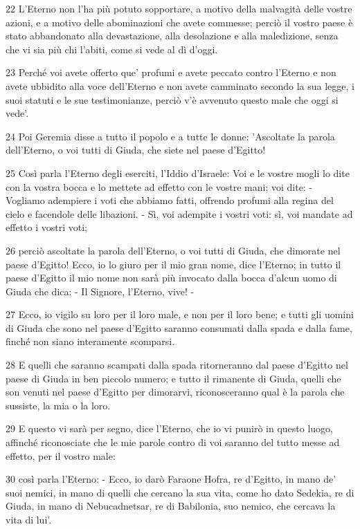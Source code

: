 \par 22 L'Eterno non l'ha più potuto sopportare, a motivo della malvagità delle vostre azioni, e a motivo delle abominazioni che avete commesse; perciò il vostro paese è stato abbandonato alla devastazione, alla desolazione e alla maledizione, senza che vi sia più chi l'abiti, come si vede al dì d'oggi.
\par 23 Perché voi avete offerto que' profumi e avete peccato contro l'Eterno e non avete ubbidito alla voce dell'Eterno e non avete camminato secondo la sua legge, i suoi statuti e le sue testimonianze, perciò v'è avvenuto questo male che oggi si vede'.
\par 24 Poi Geremia disse a tutto il popolo e a tutte le donne: 'Ascoltate la parola dell'Eterno, o voi tutti di Giuda, che siete nel paese d'Egitto!
\par 25 Così parla l'Eterno degli eserciti, l'Iddio d'Israele: Voi e le vostre mogli lo dite con la vostra bocca e lo mettete ad effetto con le vostre mani; voi dite: - Vogliamo adempiere i voti che abbiamo fatti, offrendo profumi alla regina del cielo e facendole delle libazioni. - Sì, voi adempite i vostri voti: sì, voi mandate ad effetto i vostri voti;
\par 26 perciò ascoltate la parola dell'Eterno, o voi tutti di Giuda, che dimorate nel paese d'Egitto! Ecco, io lo giuro per il mio gran nome, dice l'Eterno; in tutto il paese d'Egitto il mio nome non sarà più invocato dalla bocca d'alcun uomo di Giuda che dica: - Il Signore, l'Eterno, vive! -
\par 27 Ecco, io vigilo su loro per il loro male, e non per il loro bene; e tutti gli uomini di Giuda che sono nel paese d'Egitto saranno consumati dalla spada e dalla fame, finché non siano interamente scomparsi.
\par 28 E quelli che saranno scampati dalla spada ritorneranno dal paese d'Egitto nel paese di Giuda in ben piccolo numero; e tutto il rimanente di Giuda, quelli che son venuti nel paese d'Egitto per dimorarvi, riconosceranno qual è la parola che sussiste, la mia o la loro.
\par 29 E questo vi sarà per segno, dice l'Eterno, che io vi punirò in questo luogo, affinché riconosciate che le mie parole contro di voi saranno del tutto messe ad effetto, per il vostro male:
\par 30 così parla l'Eterno: - Ecco, io darò Faraone Hofra, re d'Egitto, in mano de' suoi nemici, in mano di quelli che cercano la sua vita, come ho dato Sedekia, re di Giuda, in mano di Nebucadnetsar, re di Babilonia, suo nemico, che cercava la vita di lui'.

